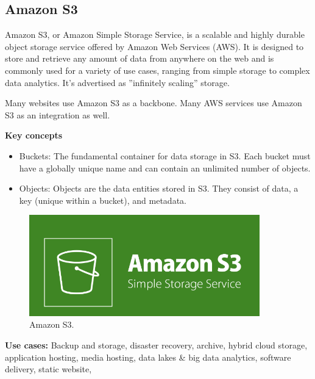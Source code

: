 \documentclass{article}
\begin{document}
\subsection{Amazon S3}
Amazon S3, or Amazon Simple Storage Service, is a scalable and highly durable object storage service offered by Amazon Web Services (AWS). It is designed to store and retrieve any amount of data from anywhere on the web and is commonly used for a variety of use cases, ranging from simple storage to complex data analytics. It’s advertised as ”infinitely scaling” storage.\par 
Many websites use Amazon S3 as a backbone. Many AWS services use Amazon S3 as an integration as well.\par
\textbf{Key concepts}\par
\begin{itemize}
    \item Buckets: The fundamental container for data storage in S3. Each bucket must have a globally unique name and can contain an unlimited number of objects.
    \item Objects: Objects are the data entities stored in S3. They consist of data, a key (unique within a bucket), and metadata.
\end{itemize}
\begin{figure}[h]
    \centering
    \includegraphics[width = 10cm]{Pictures/Theory/Amazon S3.png}
    \caption{Amazon S3.}
    \label{fig:enter-label}
\end{figure}

\textbf{Use cases: } Backup and storage, disaster recovery, archive, hybrid cloud storage, application hosting, media hosting, data lakes \& big data analytics, software delivery, static website,\par
\end{document}
